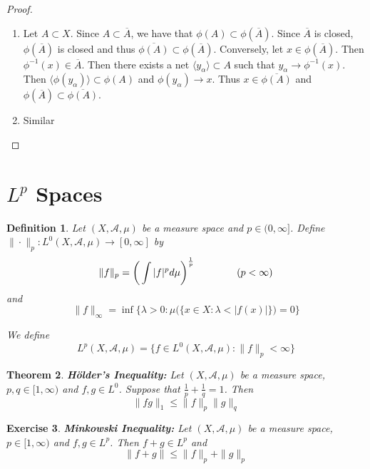 \documentclass[12pt]{amsart}
\newtheorem{thm}{Theorem}[subsection]
\newtheorem{defn}[thm]{Definition}
\newtheorem{ex}[thm]{Exercise}
\newcommand{\al}{\alpha}
\newcommand{\lam}{\lambda}
\newcommand{\MA}{\mathcal{A}}
\renewcommand{\r}{\rangle}
\renewcommand{\l}{\langle}
\begin{document}
	\begin{proof}\
		\begin{enumerate}
			\item Let $A \subset X$. Since $A \subset \overline{A}$, we have that $\phi(A) \subset \phi(\overline{A})$. Since $\overline{A}$ is closed, $\phi(\overline{A})$ is closed and thus $\overline{\phi(A)} \subset \phi(\overline{A})$. Conversely, let $x \in \phi(\overline{A})$. Then $\phi^{-1}(x) \in \overline{A}$. Then there exists a net $\l y_{\al}\r \subset A$ such that $y_{\al} \rightarrow \phi^{-1}(x)$. Then $\l \phi(y_{\al}) \r \subset \phi(A)$ and $\phi(y_{\al}) \rightarrow x$. Thus $x \in \overline{\phi(A)}$ and $\phi(\overline{A}) \subset \overline{\phi(A)}$.
			\item Similar
		\end{enumerate} 
	\end{proof}
	
	\section{$L^{p}$ Spaces}
	
	\begin{defn}
		Let $(X, \MA, \mu)$ be a measure space and $p \in (0, \infty]$. Define $  \| \cdot \|_p : L^0(X, \MA, \mu) \rightarrow [0, \infty]$ by $$\|f \|_p = \bigg(\int \vert f \vert^p d\mu \bigg)^{\frac{1}{p}} \hspace{1.5cm}( p < \infty)$$ 
		and 
		$$\|f \|_{\infty} = \inf \bigg \{\lam >0: \mu\big(\{x \in X: \lam < \vert f(x) \vert  \}\big) = 0 \bigg \} $$
		
		
		We define $$L^p(X, \MA, \mu) =  \{f \in L^0(X, \MA, \mu): \|f \|_p < \infty \}$$
	\end{defn}
	
	\begin{thm}{\textbf{Hölder's Inequality:}}
		Let $(X, \MA, \mu)$ be a measure space, $p,q \in [1, \infty)$ and $f,g \in L^0$. Suppose that $\frac{1}{p} + \frac{1}{q} = 1$. Then $$\|fg\|_1 \leq \|f \|_p \|g \|_q$$
	\end{thm}
	
	\begin{ex}\textbf{Minkowski Inequality:}
		Let $(X, \MA, \mu)$ be a measure space, $p \in [1, \infty)$ and $f,g \in L^p$. Then $f+g \in L^p$ and $$\|f+g\|\leq \|f\|_p + \|g\|_p $$
	\end{ex}
	
\end{document}
